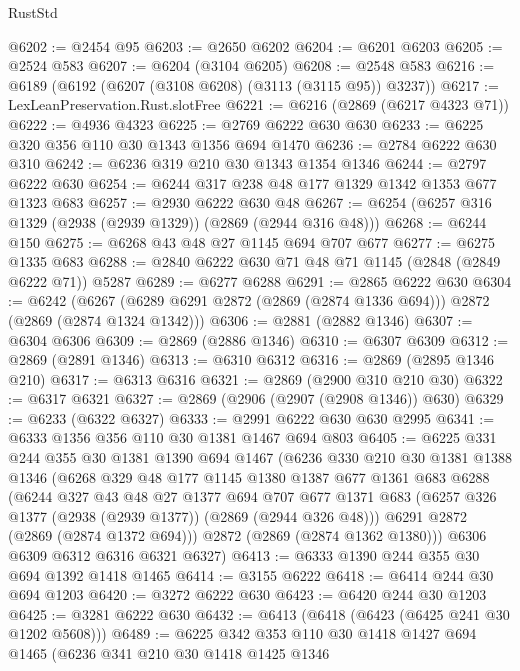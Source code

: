 \begin{lexlean}{RustStd}
\begin{coremodule}
@6202 := @2454 @95
@6203 := @2650 @6202
@6204 := @6201 @6203
@6205 := @2524 @583
@6207 := @6204 (@3104 @6205)
@6208 := @2548 @583
@6216 := @6189 (@6192 (@6207 (@3108 @6208) (@3113 (@3115 @95)) @3237))
@6217 := LexLeanPreservation.Rust.slotFree
@6221 := @6216 (@2869 (@6217 @4323 @71))
@6222 := @4936 @4323
@6225 := @2769 @6222 @630 @630
@6233 := @6225 @320 @356 @110 @30 @1343 @1356 @694 @1470
@6236 := @2784 @6222 @630 @310
@6242 := @6236 @319 @210 @30 @1343 @1354 @1346
@6244 := @2797 @6222 @630
@6254 := @6244 @317 @238 @48 @177 @1329 @1342 @1353 @677 @1323 @683
@6257 := @2930 @6222 @630 @48
@6267 := @6254 (@6257 @316 @1329 (@2938 (@2939 @1329)) (@2869 (@2944 @316 @48)))
@6268 := @6244 @150
@6275 := @6268 @43 @48 @27 @1145 @694 @707 @677
@6277 := @6275 @1335 @683
@6288 := @2840 @6222 @630 @71 @48 @71 @1145 (@2848 (@2849 @6222 @71)) @5287
@6289 := @6277 @6288
@6291 := @2865 @6222 @630
@6304 := @6242
    (@6267 (@6289 @6291 @2872 (@2869 (@2874 @1336 @694))) @2872 (@2869 (@2874 @1324 @1342)))
@6306 := @2881 (@2882 @1346)
@6307 := @6304 @6306
@6309 := @2869 (@2886 @1346)
@6310 := @6307 @6309
@6312 := @2869 (@2891 @1346)
@6313 := @6310 @6312
@6316 := @2869 (@2895 @1346 @210)
@6317 := @6313 @6316
@6321 := @2869 (@2900 @310 @210 @30)
@6322 := @6317 @6321
@6327 := @2869 (@2906 (@2907 (@2908 @1346)) @630)
@6329 := @6233 (@6322 @6327)
@6333 := @2991 @6222 @630 @630 @2995
@6341 := @6333 @1356 @356 @110 @30 @1381 @1467 @694 @803
@6405 := @6225
    @331
    @244
    @355
    @30
    @1381
    @1390
    @694
    @1467
    (@6236
      @330
      @210
      @30
      @1381
      @1388
      @1346
      (@6268
        @329
        @48
        @177
        @1145
        @1380
        @1387
        @677
        @1361
        @683
        @6288
        (@6244
          @327
          @43
          @48
          @27
          @1377
          @694
          @707
          @677
          @1371
          @683
          (@6257 @326 @1377 (@2938 (@2939 @1377)) (@2869 (@2944 @326 @48)))
          @6291
          @2872
          (@2869 (@2874 @1372 @694)))
        @2872
        (@2869 (@2874 @1362 @1380)))
      @6306
      @6309
      @6312
      @6316
      @6321
      @6327)
@6413 := @6333 @1390 @244 @355 @30 @694 @1392 @1418 @1465
@6414 := @3155 @6222
@6418 := @6414 @244 @30 @694 @1203
@6420 := @3272 @6222 @630
@6423 := @6420 @244 @30 @1203
@6425 := @3281 @6222 @630
@6432 := @6413 (@6418 (@6423 (@6425 @241 @30 @1202 @5608)))
@6489 := @6225
    @342
    @353
    @110
    @30
    @1418
    @1427
    @694
    @1465
    (@6236
      @341
      @210
      @30
      @1418
      @1425
      @1346

\end{coremodule}
\end{lexlean}
